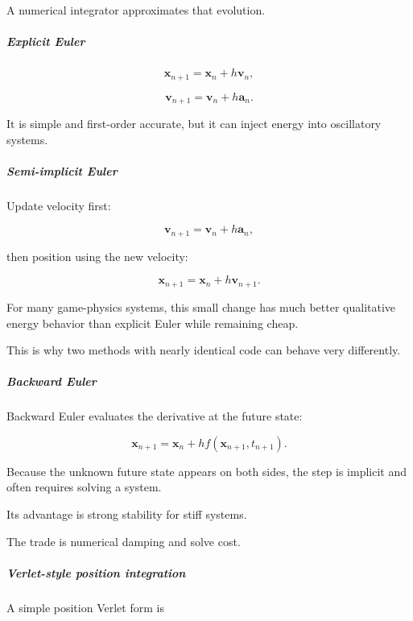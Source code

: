 A numerical integrator approximates that evolution.

\subparagraph{Explicit Euler}\label{03-visual-computing-i-ch001-explicit-euler}

\hypertarget{03-visual-computing-i-ch001-explicit-euler}{}

\[
\mathbf x_{n+1}
=
\mathbf x_n+h\mathbf v_n,
\]

\[
\mathbf v_{n+1}
=
\mathbf v_n+h\mathbf a_n.
\]

It is simple and first-order accurate, but it can inject energy into oscillatory systems.

\subparagraph{Semi-implicit Euler}\label{03-visual-computing-i-ch001-semi-implicit-euler}

\hypertarget{03-visual-computing-i-ch001-semi-implicit-euler}{}

Update velocity first:

\[
\mathbf v_{n+1}
=
\mathbf v_n+h\mathbf a_n,
\]

then position using the new velocity:

\[
\mathbf x_{n+1}
=
\mathbf x_n+h\mathbf v_{n+1}.
\]

For many game-physics systems, this small change has much better qualitative energy behavior than explicit Euler while remaining cheap.

This is why two methods with nearly identical code can behave very differently.

\subparagraph{Backward Euler}\label{03-visual-computing-i-ch001-backward-euler}

\hypertarget{03-visual-computing-i-ch001-backward-euler}{}

Backward Euler evaluates the derivative at the future state:

\[
\mathbf x_{n+1}
=
\mathbf x_n
+
h f(\mathbf x_{n+1},t_{n+1}).
\]

Because the unknown future state appears on both sides, the step is implicit and often requires solving a system.

Its advantage is strong stability for stiff systems.

The trade is numerical damping and solve cost.

\subparagraph{Verlet-style position integration}\label{03-visual-computing-i-ch001-verlet-style-position-integration}

\hypertarget{03-visual-computing-i-ch001-verlet-style-position-integration}{}

A simple position Verlet form is

